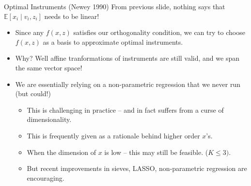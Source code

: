 \documentclass[xcolor=pdftex,dvipsnames,table,mathserif,aspectratio=169]{beamer}
\begin{document}
\begin{frame}{Optimal Instruments (Newey 1990)}
From previous slide, nothing says that $\mathbb{E}\left[x_i \mid v_i, z_i \right]$ needs to be \alert{linear}!
\begin{itemize}
\item Since any $f(x,z)$ satisfies our orthogonality condition, we can try to choose $f(x,z)$ as a \alert{basis} to approximate optimal instruments.
\item Why? Well affine tranformations of instruments are still valid, and we span the same vector space!
\item We are essentially relying on a non-parametric regression that we never run (but could!)
\begin{itemize}
\item This is challenging in practice -- and in fact suffers from a curse of dimensionality.
\item This is frequently given as a rationale behind higher order $x$'s.
\item When the dimension of $x$ is low -- this may still be feasible. ($K \leq 3)$.
\item But recent improvements in sieves, LASSO, non-parametric regression are encouraging.
\end{itemize}
\end{itemize}
\end{frame}
\end{document}
